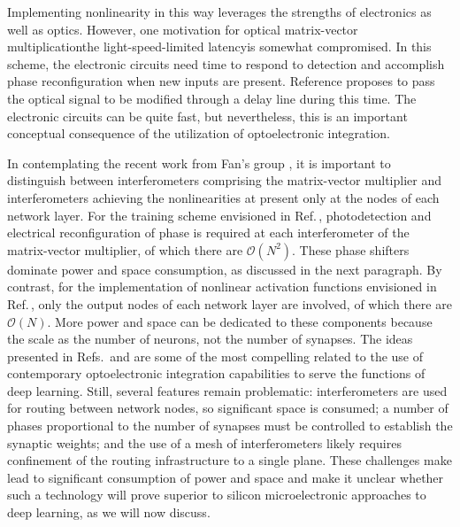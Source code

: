 \cite{wihu2019} Implementing nonlinearity in this way leverages the strengths of electronics as well as optics. However, one motivation for optical matrix-vector multiplication\textemdash the light-speed-limited latency\textemdash is somewhat compromised. In this scheme, the electronic circuits need time to respond to detection and accomplish phase reconfiguration when new inputs are present. Reference  proposes to pass the optical signal to be modified through a delay line during this time. The electronic circuits can be quite fast, but nevertheless, this is an important conceptual consequence of the utilization of optoelectronic integration. 

In contemplating the recent work from Fan's group \cite{humi2018,wihu2019}, it is important to distinguish between interferometers comprising the matrix-vector multiplier and interferometers achieving the nonlinearities at present only at the nodes of each network layer. For the training scheme envisioned in Ref.\,\cite{humi2018}, photodetection and electrical reconfiguration of phase is required at each interferometer of the matrix-vector multiplier, of which there are $\mathcal{O}(N^2)$. These phase shifters dominate power and space consumption, as discussed in the next paragraph. By contrast, for the implementation of nonlinear activation functions envisioned in Ref.\,\cite{wihu2019}, only the output nodes of each network layer are involved, of which there are $\mathcal{O}(N)$. More power and space can be dedicated to these components because the scale as the number of neurons, not the number of synapses. The ideas presented in Refs.\, and  are some of the most compelling related to the use of contemporary optoelectronic integration capabilities to serve the functions of deep learning. Still, several features remain problematic: interferometers are used for routing between network nodes, so significant space is consumed; a number of phases proportional to the number of synapses must be controlled to establish the synaptic weights; and the use of a mesh of interferometers likely requires confinement of the routing infrastructure to a single plane. These challenges make lead to significant consumption of power and space and make it unclear whether such a technology will prove superior to silicon microelectronic approaches to deep learning, as we will now discuss.

